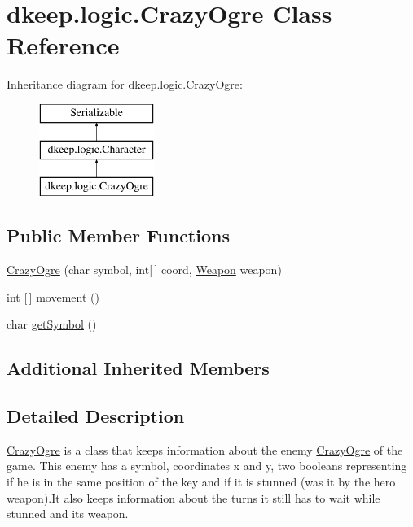\hypertarget{classdkeep_1_1logic_1_1_crazy_ogre}{}\section{dkeep.\+logic.\+Crazy\+Ogre Class Reference}
\label{classdkeep_1_1logic_1_1_crazy_ogre}
Inheritance diagram for dkeep.\+logic.\+Crazy\+Ogre\+:\begin{figure}[H]
\begin{center}
\leavevmode
\includegraphics[height=3.000000cm]{classdkeep_1_1logic_1_1_crazy_ogre}
\end{center}
\end{figure}
\subsection*{Public Member Functions}
\begin{DoxyCompactItemize}
\item 
\hyperlink{classdkeep_1_1logic_1_1_crazy_ogre_a80eeff663b6b50957cb22dfd0f738a8e}{Crazy\+Ogre} (char symbol, int\mbox{[}$\,$\mbox{]} coord, \hyperlink{classdkeep_1_1logic_1_1_weapon}{Weapon} weapon)
\item 
int \mbox{[}$\,$\mbox{]} \hyperlink{classdkeep_1_1logic_1_1_crazy_ogre_a4b12a877e7adb6af8b40d987f0b37e8c}{movement} ()
\item 
char \hyperlink{classdkeep_1_1logic_1_1_crazy_ogre_af1bf05bce7387b6ac6800d7b4290565c}{get\+Symbol} ()
\end{DoxyCompactItemize}
\subsection*{Additional Inherited Members}


\subsection{Detailed Description}
\hyperlink{classdkeep_1_1logic_1_1_crazy_ogre}{Crazy\+Ogre} is a class that keeps information about the enemy \hyperlink{classdkeep_1_1logic_1_1_crazy_ogre}{Crazy\+Ogre} of the game. This enemy has a symbol, coordinates x and y, two booleans representing if he is in the same position of the key and if it is stunned (was it by the hero weapon).It also keeps information about the turns it still has to wait while stunned and it\textquotesingle{}s weapon.

